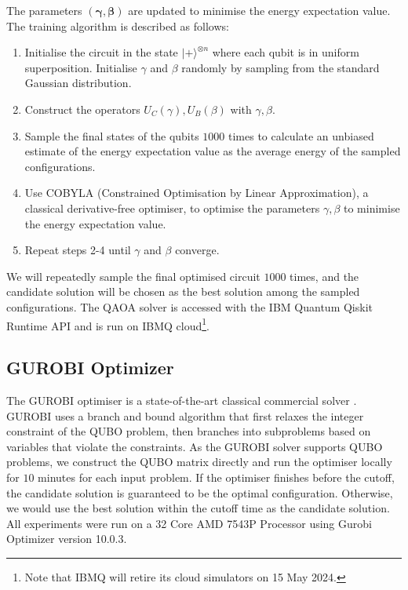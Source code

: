 The parameters $(\boldsymbol{\gamma}, \boldsymbol{\beta})$ are updated to minimise the energy expectation value. The training algorithm is described as follows:
\begin{enumerate}
    \item Initialise the circuit in the state $| + \rangle^{\otimes n}$ where each qubit is in uniform superposition. Initialise $\gamma$ and $\beta$ randomly by sampling from the standard Gaussian distribution. 
    \item Construct the operators $U_C(\gamma), U_B(\beta)$ with $\gamma, \beta$.
    \item Sample the final states of the qubits $1000$ times to calculate an unbiased estimate of the energy expectation value as the average energy of the sampled configurations.
    \item Use COBYLA (Constrained Optimisation by Linear Approximation), a classical derivative-free optimiser, to optimise the parameters $\gamma, \beta$ to minimise the energy expectation value.
    \item Repeat steps 2-4 until $\gamma$ and $\beta$ converge.
\end{enumerate}
We will repeatedly sample the final optimised circuit $1000$ times, and the candidate solution will be chosen as the best solution among the sampled configurations. The QAOA solver is accessed with the IBM Quantum Qiskit Runtime API and is run on IBMQ cloud\footnote{Note that IBMQ will retire its cloud simulators on 15 May 2024.}.

\subsection{GUROBI Optimizer}
The GUROBI optimiser is a state-of-the-art classical commercial solver \cite{b26}. GUROBI uses a branch and bound algorithm that first relaxes the integer constraint of the QUBO problem, then branches into subproblems based on variables that violate the constraints. As the GUROBI solver supports QUBO problems, we construct the QUBO matrix directly and run the optimiser locally for $10$ minutes for each input problem. If the optimiser finishes before the cutoff, the candidate solution is guaranteed to be the optimal configuration. Otherwise, we would use the best solution within the cutoff time as the candidate solution.  All experiments were run on a 32 Core AMD 7543P Processor using Gurobi Optimizer version 10.0.3.



